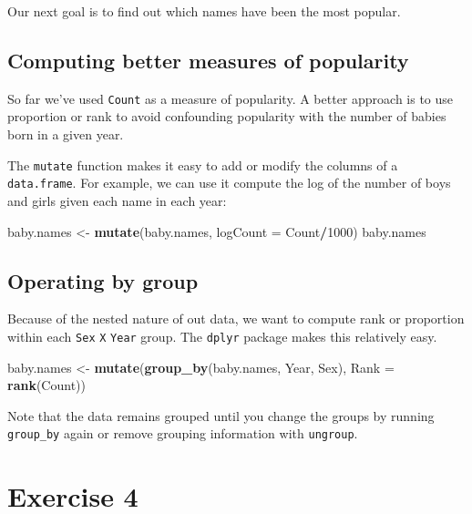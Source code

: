\documentclass[]{book}
\newenvironment{Shaded}{\begin{snugshade}}{\end{snugshade}}
\newcommand{\KeywordTok}[1]{\textcolor[rgb]{0.13,0.29,0.53}{\textbf{#1}}}
\newcommand{\DataTypeTok}[1]{\textcolor[rgb]{0.13,0.29,0.53}{#1}}
\newcommand{\DecValTok}[1]{\textcolor[rgb]{0.00,0.00,0.81}{#1}}
\newcommand{\StringTok}[1]{\textcolor[rgb]{0.31,0.60,0.02}{#1}}
\newcommand{\OperatorTok}[1]{\textcolor[rgb]{0.81,0.36,0.00}{\textbf{#1}}}
\newcommand{\NormalTok}[1]{#1}
\begin{document}
Our next goal is to find out which names have been the most popular.

\subsection{Computing better measures of
popularity}\label{computing-better-measures-of-popularity}

So far we've used \texttt{Count} as a measure of popularity. A better
approach is to use proportion or rank to avoid confounding popularity
with the number of babies born in a given year.

The \texttt{mutate} function makes it easy to add or modify the columns
of a \texttt{data.frame}. For example, we can use it compute the log of
the number of boys and girls given each name in each year:

\begin{Shaded}
\begin{Highlighting}[]
\NormalTok{baby.names <-}\StringTok{ }\KeywordTok{mutate}\NormalTok{(baby.names, }\DataTypeTok{logCount =}\NormalTok{ Count}\OperatorTok{/}\DecValTok{1000}\NormalTok{)}
\NormalTok{baby.names}
\end{Highlighting}
\end{Shaded}

\subsection{Operating by group}\label{operating-by-group}

Because of the nested nature of out data, we want to compute rank or
proportion within each \texttt{Sex} \texttt{X} \texttt{Year} group. The
\texttt{dplyr} package makes this relatively easy.

\begin{Shaded}
\begin{Highlighting}[]
\NormalTok{baby.names <-}\StringTok{ }\KeywordTok{mutate}\NormalTok{(}\KeywordTok{group_by}\NormalTok{(baby.names, Year, Sex),}
                     \DataTypeTok{Rank =} \KeywordTok{rank}\NormalTok{(Count))}
\end{Highlighting}
\end{Shaded}

Note that the data remains grouped until you change the groups by
running \texttt{group\_by} again or remove grouping information with
\texttt{ungroup}.

\section{Exercise 4}\label{exercise-4}
\end{document}
